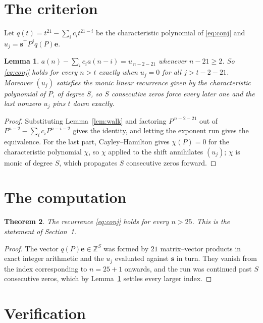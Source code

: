 \documentclass[11pt,a4paper]{article}
\theoremstyle{plain}
\newtheorem{theorem}{Theorem}
\newtheorem{lemma}[theorem]{Lemma}
\theoremstyle{definition}
\begin{document}
\section{The criterion}

Let $q(t)=t^{21}-\sum_i c_i t^{21-i}$ be the characteristic polynomial of
\eqref{eq:conj} and $u_j=\mathbf{s}^{\!\top}P^{j}q(P)\mathbf{e}$.

\begin{lemma}\label{lem:crit}
$a(n)-\sum_i c_i a(n-i)=u_{\,n-2-21}$ whenever $n-21\ge2$. So \eqref{eq:conj}
holds for every $n>t$ exactly when $u_j=0$ for all $j>t-2-21$. Moreover $(u_j)$
satisfies the monic linear recurrence given by the characteristic polynomial of $P$, of
degree $S$, so $S$ consecutive zeros force every later one and the last nonzero $u_j$ pins
$t$ down exactly.
\end{lemma}

\begin{proof}
Substituting Lemma~\ref{lem:walk} and factoring $P^{\,n-2-21}$ out of
$P^{n-2}-\sum_i c_i P^{n-i-2}$ gives the identity, and letting the exponent run gives the
equivalence. For the last part, Cayley--Hamilton gives $\chi(P)=0$ for the characteristic
polynomial $\chi$, so $\chi$ applied to the shift annihilates $(u_j)$; $\chi$ is monic of
degree $S$, which propagates $S$ consecutive zeros forward.
\end{proof}

\section{The computation}

\begin{theorem}
The recurrence \eqref{eq:conj} holds for every $n>25$. This is the statement of
Section~1.
\end{theorem}

\begin{proof}
The vector $q(P)\mathbf{e}\in\mathbb{Z}^{S}$ was formed by $21$ matrix--vector
products in exact integer arithmetic and the $u_j$ evaluated against $\mathbf{s}$ in turn.
They vanish from the index corresponding to $n=25+1$ onwards, and the run was continued
past $S$ consecutive zeros, which by Lemma~\ref{lem:crit} settles every larger index.
\end{proof}

\section{Verification}
\end{document}
